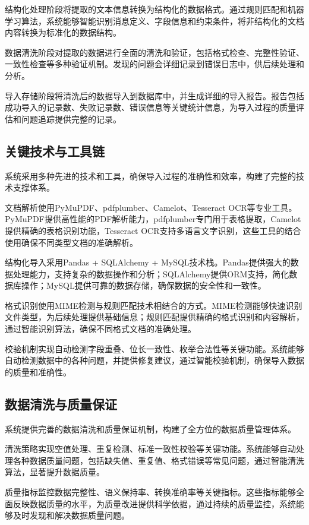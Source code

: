 结构化处理阶段将提取的文本信息转换为结构化的数据格式。通过规则匹配和机器学习算法，系统能够智能识别消息定义、字段信息和约束条件，将非结构化的文档内容转换为标准化的数据结构。

数据清洗阶段对提取的数据进行全面的清洗和验证，包括格式检查、完整性验证、一致性检查等多种验证机制。发现的问题会详细记录到错误日志中，供后续处理和分析。

导入存储阶段将清洗后的数据导入到数据库中，并生成详细的导入报告。报告包括成功导入的记录数、失败记录数、错误信息等关键统计信息，为导入过程的质量评估和问题追踪提供完整的记录。

\subsection{关键技术与工具链}

系统采用多种先进的技术和工具，确保导入过程的准确性和效率，构建了完整的技术支撑体系。

文档解析使用PyMuPDF、pdfplumber、Camelot、Tesseract OCR等专业工具。PyMuPDF提供高性能的PDF解析能力，pdfplumber专门用于表格提取，Camelot提供精确的表格识别功能，Tesseract OCR支持多语言文字识别，这些工具的结合使用确保不同类型文档的准确解析。

结构化导入采用Pandas + SQLAlchemy + MySQL技术栈。Pandas提供强大的数据处理能力，支持复杂的数据操作和分析；SQLAlchemy提供ORM支持，简化数据库操作；MySQL提供可靠的数据存储，确保数据的安全性和一致性。

格式识别使用MIME检测与规则匹配技术相结合的方式。MIME检测能够快速识别文件类型，为后续处理提供基础信息；规则匹配提供精确的格式识别和内容解析，通过智能识别算法，确保不同格式文档的准确处理。

校验机制实现自动检测字段重叠、位长一致性、枚举合法性等关键功能。系统能够自动检测数据中的各种问题，并提供修复建议，通过智能校验机制，确保导入数据的质量和准确性。


\subsection{数据清洗与质量保证}

系统提供完善的数据清洗和质量保证机制，构建了全方位的数据质量管理体系。

清洗策略实现空值处理、重复检测、标准一致性校验等关键功能。系统能够自动处理各种数据质量问题，包括缺失值、重复值、格式错误等常见问题，通过智能清洗算法，显著提升数据质量。

质量指标监控数据完整性、语义保持率、转换准确率等关键指标。这些指标能够全面反映数据质量的水平，为质量改进提供科学依据，通过持续的质量监控，系统能够及时发现和解决数据质量问题。

